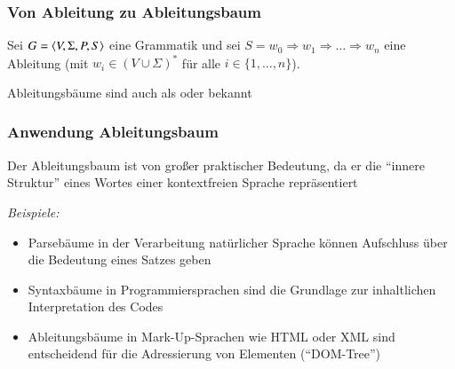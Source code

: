 \documentclass[onlymath]{beamer}
\begin{document}
\begin{frame}\frametitle{Von Ableitung zu Ableitungsbaum}

Sei $G=\langle{V,\Sigma,P,S}\rangle$ eine Grammatik
und sei $S=w_0\Rightarrow\allowbreak w_1 \Rightarrow\allowbreak \ldots \allowbreak\Rightarrow w_n$ eine Ableitung
(mit $w_i\in (V\cup\Sigma)^*$ für alle $i\in\{1,\ldots,n\}$).
\bigskip

% 

Ableitungsbäume sind auch als  oder  bekannt

\end{frame}

\begin{frame}\frametitle{Anwendung Ableitungsbaum}

Der Ableitungsbaum ist von großer praktischer Bedeutung, 
da er die \alert{"`innere Struktur"'} eines Wortes einer kontextfreien Sprache
repräsentiert
\bigskip

{}%
\bigskip

\emph{Beispiele:}
\begin{itemize}
\item Parsebäume in der \alert{Verarbeitung natürlicher Sprache} können Aufschluss über die Bedeutung eines Satzes geben
\item Syntaxbäume in \alert{Programmiersprachen} sind die Grundlage zur inhaltlichen Interpretation des Codes
\item Ableitungsbäume in \alert{Mark-Up-Sprachen} wie HTML oder XML sind entscheidend für die Adressierung von Elementen ("`DOM-Tree"')
\end{itemize}

\end{frame}
\end{document}
